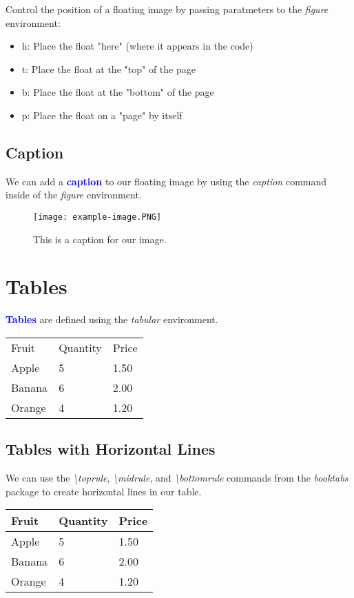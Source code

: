 \documentclass{article}
\newcommand{\kw}[1]{\textcolor{blue}{\textbf{#1}}}
\newcommand{\cmd}[1]{\textit{#1}}
\begin{document}
Control the position of a floating image by passing paratmeters to the \cmd{figure} environment:

\begin{itemize}
  \item h: Place the float "here" (where it appears in the code)
  \item t: Place the float at the "top" of the page
  \item b: Place the float at the "bottom" of the page
  \item p: Place the float on a "page" by itself
\end{itemize}

\subsection{Caption}

We can add a \kw{caption} to our floating image by using the \cmd{caption} command inside of the
\cmd{figure} environment.

\begin{figure}[h]
  \centering
  \texttt{[image: example-image.PNG]}
  \caption{This is a caption for our image.}
\end{figure}

\section{Tables}

\kw{Tables} are defined using the \cmd{tabular} environment.

\begin{tabular}{*{3}{l}}
  Fruit  & Quantity & Price \\
  Apple  & 5        & 1.50  \\
  Banana & 6        & 2.00  \\
  Orange & 4        & 1.20  \\
\end{tabular}

\subsection{Tables with Horizontal Lines}

We can use the \cmd{\textbackslash toprule}, \cmd{\textbackslash midrule}, and
\cmd{\textbackslash bottomrule} commands from the \cmd{booktabs} package to create horizontal
lines in our table.

\begin{tabular}{*{3}{l}}
  \toprule
  Fruit  & Quantity & Price \\
  \midrule
  Apple  & 5        & 1.50  \\
  Banana & 6        & 2.00  \\
  Orange & 4        & 1.20  \\
  \bottomrule
\end{tabular}
\end{document}
